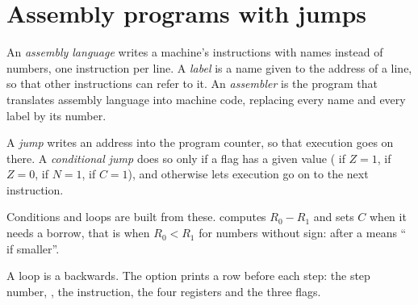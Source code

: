 \section{Assembly programs with jumps}\label{sec:g11:von-neumann-machine:assembly}

\begin{definition}\label{def:g11:von-neumann-machine:assembly}
An \emph{assembly language} writes a machine's instructions with names instead of numbers,
one instruction per line. A \emph{label} is a name given to the address of a line, so that other
instructions can refer to it. An \emph{assembler} is the program that translates assembly language
into machine code, replacing every name and every label by its number.
\end{definition}

\begin{definition}\label{def:g11:von-neumann-machine:jump}
A \emph{jump} writes an address into the program counter, so that execution goes on there. A
\emph{conditional jump} does so only if a flag has a given value ( if $Z = 1$,
 if $Z = 0$,  if $N = 1$,  if $C = 1$), and otherwise lets execution go on to the next
instruction.
\end{definition}

Conditions and loops are built from these.  computes $R_0 - R_1$ and sets $C$ when it needs a
borrow, that is when $R_0 < R_1$ for numbers without sign:  after a  means `` if smaller''.

\label{lst:g11:von-neumann-machine:max2}

\label{out:g11:von-neumann-machine:max2}

A loop is a  backwards. The option  prints a row before each step: the step number, , the
instruction, the four registers and the three flags.

\label{lst:g11:von-neumann-machine:count-down}

